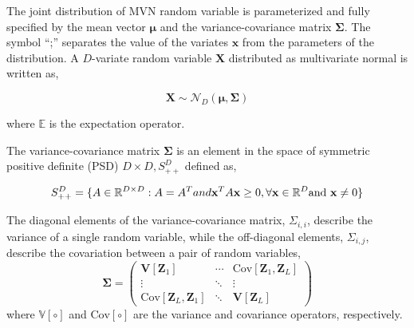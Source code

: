 The joint distribution of MVN random variable is parameterized and fully specified by the mean vector $\boldsymbol{\mu}$ and the variance-covariance matrix $\boldsymbol{\Sigma}$. The symbol ``;'' separates the value of the variates $\boldsymbol{x}$ from the parameters of the distribution. 
A $D$-variate random variable $\boldsymbol{X}$ distributed as multivariate normal is written as,

\begin{equation}
	\boldsymbol{X} \sim \mathcal{N}_D\left(\boldsymbol{\mu}, \boldsymbol{\Sigma}\right)
\end{equation}

where $\mathbb{E}$ is the expectation operator.

The variance-covariance matrix $\boldsymbol{\Sigma}$ is an element in the space of symmetric positive definite (PSD) $D \times D, S_{++}^D$ defined as,

\begin{equation}
	S_{++}^D = \{A \in \mathbb{R}^{D\times D}: A = A^T and \mathbf{x}^T A \mathbf{x} \geq 0, \forall \mathbf{x} \in \mathbb{R}^D \textnormal{and } \mathbf{x} \neq 0 \}
	\label{eq:def_covariance_matrix}
\end{equation}






The diagonal elements of the variance-covariance matrix, $\Sigma_{i,i}$, describe the variance of a single random variable,
while the off-diagonal elements, $\Sigma_{i,j}$, describe the covariation between a pair of random variables,
\begin{equation}
	\boldsymbol{\Sigma} =
	\begin{pmatrix}
			\mathbf{V}[\mathbf{Z}_1] & \cdots                & \text{Cov}[\mathbf{Z}_1, \mathbf{Z}_L] \\
			\vdots                   & \ddots                & \vdots \\
			\text{Cov}[\mathbf{Z}_L, \mathbf{Z}_1] & \ddots & \mathbf{V}[\mathbf{Z}_L]
	\end{pmatrix}
\label{eq:covariance_matrix}
\end{equation}
where $\mathbb{V} [\circ]$ and $\text{Cov} [\circ]$ are the variance and covariance operators, respectively. 

